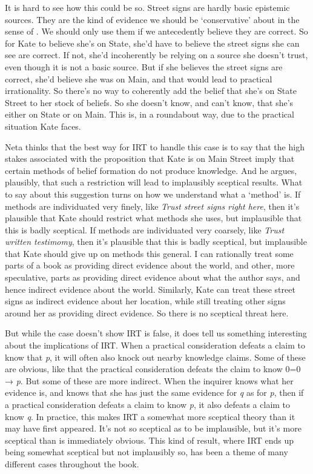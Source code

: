 \documentclass[
  11pt,
]{book}
\begin{document}
It is hard to see how this could be so. Street signs are hardly basic epistemic sources. They are the kind of evidence we should be `conservative' about in the sense of \citet{Pryor2004}. We should only use them if we antecedently believe they are correct. So for Kate to believe she's on State, she'd have to believe the street signs she can see are correct. If not, she'd incoherently be relying on a source she doesn't trust, even though it is not a basic source. But if she believes the street signs are correct, she'd believe she was on Main, and that would lead to practical irrationality. So there's no way to coherently add the belief that she's on State Street to her stock of beliefs. So she doesn't know, and can't know, that she's either on State or on Main. This is, in a roundabout way, due to the practical situation Kate faces.

Neta thinks that the best way for IRT to handle this case is to say that the high stakes associated with the proposition that Kate is on Main Street imply that certain methods of belief formation do not produce knowledge. And he argues, plausibly, that such a restriction will lead to implausibly sceptical results. What to say about this suggestion turns on how we understand what a `method' is. If methods are individuated very finely, like \emph{Trust street signs right here}, then it's plausible that Kate should restrict what methods she uses, but implausible that this is badly sceptical. If methods are individuated very coarsely, like \emph{Trust written testimomy}, then it's plausible that this is badly sceptical, but implausible that Kate should give up on methods this general. I can rationally treat some parts of a book as providing direct evidence about the world, and other, more speculative, parts as providing direct evidence about what the author says, and hence indirect evidence about the world. Similarly, Kate can treat these street signs as indirect evidence about her location, while still treating other signs around her as providing direct evidence. So there is no sceptical threat here.

But while the case doesn't show IRT is false, it does tell us something interesting about the implications of IRT. When a practical consideration defeats a claim to know that \emph{p}, it will often also knock out nearby knowledge claims. Some of these are obvious, like that the practical consideration defeats the claim to know 0=0 → \emph{p}. But some of these are more indirect. When the inquirer knows what her evidence is, and knows that she has just the same evidence for \emph{q} as for \emph{p}, then if a practical consideration defeats a claim to know \emph{p}, it also defeats a claim to know \emph{q}. In practice, this makes IRT a somewhat more sceptical theory than it may have first appeared. It's not so sceptical as to be implausible, but it's more sceptical than is immediately obvious. This kind of result, where IRT ends up being somewhat sceptical but not implausibly so, has been a theme of many different cases throughout the book.
\end{document}

